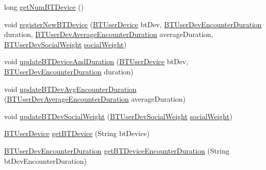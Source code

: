 \begin{DoxyCompactItemize}
\item 
long \hyperlink{classcs_1_1usense_1_1db_1_1_usense_data_source_a158073fd29763e580866798e7e65ef3e}{get\+Num\+B\+T\+Device} ()
\item 
void \hyperlink{classcs_1_1usense_1_1db_1_1_usense_data_source_a00733a5faba0031ae832092fd16fe30d}{register\+New\+B\+T\+Device} (\hyperlink{classcs_1_1usense_1_1bluetooth_1_1_b_t_user_device}{B\+T\+User\+Device} bt\+Dev, \hyperlink{classcs_1_1usense_1_1bluetooth_1_1_b_t_user_dev_encounter_duration}{B\+T\+User\+Dev\+Encounter\+Duration} duration, \hyperlink{classcs_1_1usense_1_1bluetooth_1_1_b_t_user_dev_average_encounter_duration}{B\+T\+User\+Dev\+Average\+Encounter\+Duration} average\+Duration, \hyperlink{classcs_1_1usense_1_1bluetooth_1_1_b_t_user_dev_social_weight}{B\+T\+User\+Dev\+Social\+Weight} \hyperlink{classcs_1_1usense_1_1bluetooth_1_1_bluetooth_core_1_1social_weight}{social\+Weight})
\item 
void \hyperlink{classcs_1_1usense_1_1db_1_1_usense_data_source_a14742aad8c76e400fe56cd07321ac202}{update\+B\+T\+Device\+And\+Duration} (\hyperlink{classcs_1_1usense_1_1bluetooth_1_1_b_t_user_device}{B\+T\+User\+Device} bt\+Dev, \hyperlink{classcs_1_1usense_1_1bluetooth_1_1_b_t_user_dev_encounter_duration}{B\+T\+User\+Dev\+Encounter\+Duration} duration)
\item 
void \hyperlink{classcs_1_1usense_1_1db_1_1_usense_data_source_a69a781c3c921797e89e42598f6938929}{update\+B\+T\+Dev\+Avg\+Encounter\+Duration} (\hyperlink{classcs_1_1usense_1_1bluetooth_1_1_b_t_user_dev_average_encounter_duration}{B\+T\+User\+Dev\+Average\+Encounter\+Duration} average\+Duration)
\item 
void \hyperlink{classcs_1_1usense_1_1db_1_1_usense_data_source_a3ded9bd1da6f82f8e6599b9d1ee5cfe6}{update\+B\+T\+Dev\+Social\+Weight} (\hyperlink{classcs_1_1usense_1_1bluetooth_1_1_b_t_user_dev_social_weight}{B\+T\+User\+Dev\+Social\+Weight} \hyperlink{classcs_1_1usense_1_1bluetooth_1_1_bluetooth_core_1_1social_weight}{social\+Weight})
\item 
\hyperlink{classcs_1_1usense_1_1bluetooth_1_1_b_t_user_device}{B\+T\+User\+Device} \hyperlink{classcs_1_1usense_1_1db_1_1_usense_data_source_a76c3bb13724a07d858cf391c3b565b72}{get\+B\+T\+Device} (String bt\+Device)
\item 
\hyperlink{classcs_1_1usense_1_1bluetooth_1_1_b_t_user_dev_encounter_duration}{B\+T\+User\+Dev\+Encounter\+Duration} \hyperlink{classcs_1_1usense_1_1db_1_1_usense_data_source_a618c08c948d949eca47872f0bb34a225}{get\+B\+T\+Device\+Encounter\+Duration} (String bt\+Dev\+Encounter\+Duration)

\end{DoxyCompactItemize}
